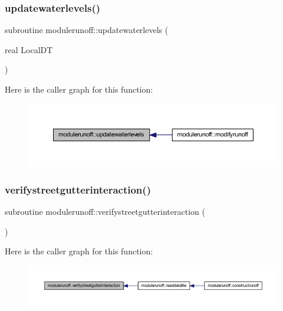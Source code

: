 \subsubsection{\texorpdfstring{updatewaterlevels()}{updatewaterlevels()}}
{\footnotesize\ttfamily subroutine modulerunoff\+::updatewaterlevels (\begin{DoxyParamCaption}\item[{real}]{Local\+DT }\end{DoxyParamCaption})\hspace{0.3cm}{\ttfamily [private]}}

Here is the caller graph for this function\+:\nopagebreak
\begin{figure}[H]
\begin{center}
\leavevmode
\includegraphics[width=350pt]{namespacemodulerunoff_ae21623961ce63cf7c148437e7ad9d934_icgraph}
\end{center}
\end{figure}
\mbox{\label{namespacemodulerunoff_ae19f70ae654f145d09a7ca02839d4f11}} 
\subsubsection{\texorpdfstring{verifystreetgutterinteraction()}{verifystreetgutterinteraction()}}
{\footnotesize\ttfamily subroutine modulerunoff\+::verifystreetgutterinteraction (\begin{DoxyParamCaption}{ }\end{DoxyParamCaption})\hspace{0.3cm}{\ttfamily [private]}}

Here is the caller graph for this function\+:\nopagebreak
\begin{figure}[H]
\begin{center}
\leavevmode
\includegraphics[width=350pt]{namespacemodulerunoff_ae19f70ae654f145d09a7ca02839d4f11_icgraph}
\end{center}
\end{figure}
\mbox{\label{namespacemodulerunoff_a2f27139bf5cc235ef3e04522e63d2f5d}} 
